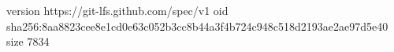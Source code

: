 version https://git-lfs.github.com/spec/v1
oid sha256:8aa8823cee8e1cd0e63c052b3cc8b44a3f4b724c948c518d2193ae2ae97d5e40
size 7834
